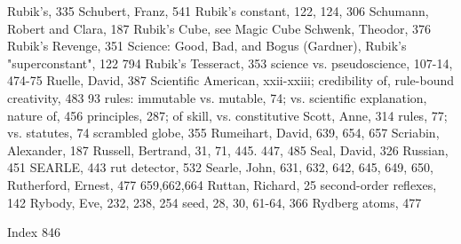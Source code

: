 Rubik's, 335                                    Schubert, Franz, 541
Rubik's constant, 122, 124, 306                 Schumann, Robert and Clara, 187
Rubik's Cube, see Magic Cube                    Schwenk, Theodor, 376
Rubik's Revenge, 351                            Science: Good, Bad, and Bogus (Gardner),
Rubik's "superconstant", 122                     794
Rubik's Tesseract, 353                          science vs. pseudoscience, 107-14, 474-75
Ruelle, David, 387                              Scientific American, xxii-xxiii; credibility of,
rule-bound creativity, 483                       93
rules: immutable vs. mutable, 74; vs.           scientific explanation, nature of, 456
 principles, 287; of skill, vs. constitutive    Scott, Anne, 314
 rules, 77; vs. statutes, 74                    scrambled globe, 355
Rumeihart, David, 639, 654, 657                 Scriabin, Alexander, 187
Russell, Bertrand, 31, 71, 445. 447, 485        Seal, David, 326
Russian, 451                                    SEARLE, 443
rut detector, 532                               Searle, John, 631, 632, 642, 645, 649, 650,
Rutherford, Ernest, 477                          659,662,664
Ruttan, Richard, 25                             second-order reflexes, 142
Rybody, Eve, 232, 238, 254                      seed, 28, 30, 61-64, 366
Rydberg atoms, 477

 Index                                                                                       846

